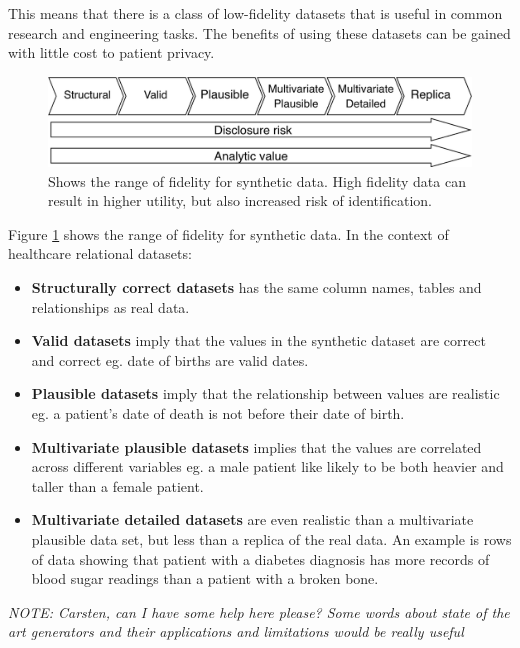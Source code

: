 \documentclass[11pt]{article}
\begin{document}
This means that there is a class of low-fidelity datasets that is useful in common research and engineering tasks. The benefits of using these datasets can be gained with little cost to patient privacy. 

\begin{figure}[Ht]
\centering
\includegraphics[width=0.8\linewidth]{figures/ONS.png}
\caption{Shows the range of fidelity for synthetic data. High fidelity data can result in higher utility, but also increased risk of identification.}
\label{fig:Range of fidelity for synthetic data}
\end{figure}

Figure \ref{fig:Range of fidelity for synthetic data} shows the range of fidelity for synthetic data. In the context of healthcare relational datasets: 

\begin{itemize}
    \item \textbf{Structurally correct datasets} has the same column names, tables and relationships as real data. 
    \item \textbf{Valid datasets} imply that the values in the synthetic dataset are correct and correct eg. date of births are valid dates. 
    \item \textbf{Plausible datasets} imply that the relationship between values are realistic eg. a patient's date of death is not before their date of birth.
    \item \textbf{Multivariate plausible datasets} implies that the values are correlated across different variables eg. a male patient like likely to be both heavier and taller than a female patient. 
    \item \textbf{Multivariate detailed datasets} are even realistic than a multivariate plausible data set, but less than a replica of the real data. An example is rows of data showing that patient with a diabetes diagnosis has more records of blood sugar readings than a patient with a broken bone.
\end{itemize}

\textit{NOTE: Carsten, can I have some help here please? Some words about state of the art generators and their applications and limitations would be really useful}
\end{document}
